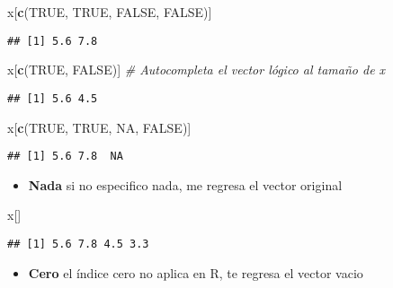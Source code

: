 \documentclass[]{article}
\newenvironment{Shaded}{\begin{snugshade}}{\end{snugshade}}
\newcommand{\KeywordTok}[1]{\textcolor[rgb]{0.13,0.29,0.53}{\textbf{#1}}}
\newcommand{\CommentTok}[1]{\textcolor[rgb]{0.56,0.35,0.01}{\textit{#1}}}
\newcommand{\OtherTok}[1]{\textcolor[rgb]{0.56,0.35,0.01}{#1}}
\newcommand{\NormalTok}[1]{#1}
\providecommand{\tightlist}{%
  \setlength{\itemsep}{0pt}\setlength{\parskip}{0pt}}
\begin{document}
\begin{Shaded}
\begin{Highlighting}[]
\NormalTok{x[}\KeywordTok{c}\NormalTok{(}\OtherTok{TRUE}\NormalTok{, }\OtherTok{TRUE}\NormalTok{, }\OtherTok{FALSE}\NormalTok{, }\OtherTok{FALSE}\NormalTok{)]}
\end{Highlighting}
\end{Shaded}

\begin{verbatim}
## [1] 5.6 7.8
\end{verbatim}

\begin{Shaded}
\begin{Highlighting}[]
\NormalTok{x[}\KeywordTok{c}\NormalTok{(}\OtherTok{TRUE}\NormalTok{, }\OtherTok{FALSE}\NormalTok{)] }\CommentTok{# Autocompleta el vector lógico al tamaño de x}
\end{Highlighting}
\end{Shaded}

\begin{verbatim}
## [1] 5.6 4.5
\end{verbatim}

\begin{Shaded}
\begin{Highlighting}[]
\NormalTok{x[}\KeywordTok{c}\NormalTok{(}\OtherTok{TRUE}\NormalTok{, }\OtherTok{TRUE}\NormalTok{, }\OtherTok{NA}\NormalTok{, }\OtherTok{FALSE}\NormalTok{)]}
\end{Highlighting}
\end{Shaded}

\begin{verbatim}
## [1] 5.6 7.8  NA
\end{verbatim}

\begin{itemize}
\tightlist
\item
  \textbf{Nada} si no especifico nada, me regresa el vector original
\end{itemize}

\begin{Shaded}
\begin{Highlighting}[]
\NormalTok{x[]}
\end{Highlighting}
\end{Shaded}

\begin{verbatim}
## [1] 5.6 7.8 4.5 3.3
\end{verbatim}

\begin{itemize}
\tightlist
\item
  \textbf{Cero} el índice cero no aplica en R, te regresa el vector
  vacio
\end{itemize}
\end{document}

